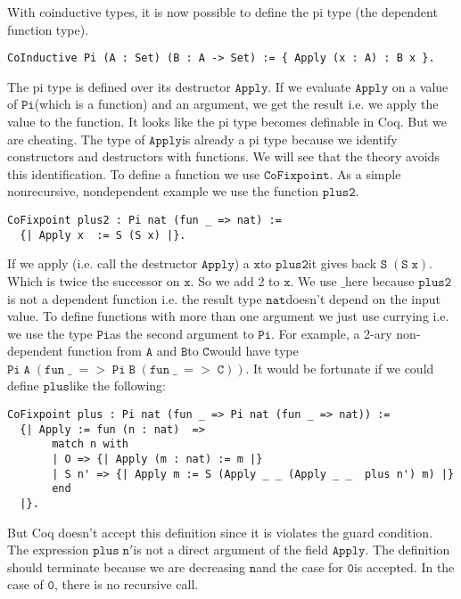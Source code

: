 \documentclass[a4paper,cleardoubleempty,BCOR1cm]{scrbook}
\begin{document}
With coinductive types, it is now possible to define the pi type (the dependent
function type).

\begin{verbatim}
CoInductive Pi (A : Set) (B : A -> Set) := { Apply (x : A) : B x }.
\end{verbatim}

The pi type is defined over its destructor $\mathtt{Apply}$.  If we evaluate $\mathtt{Apply}$
on a value of $\mathtt{Pi}$\;(which is a function) and an argument, we get the result
i.e. we apply the value to the function.  It looks like the pi type becomes definable
in Coq.  But we are cheating.  The type of $\mathtt{Apply}$\;is already a pi type because
we identify constructors and destructors with functions. We will see that
the theory \cite{basold2016type} avoids this identification. To define a
function we use $\mathtt{CoFixpoint}$. As a simple nonrecursive, nondependent example
we use the function $\mathtt{plus2}$.

\begin{verbatim}
CoFixpoint plus2 : Pi nat (fun _ => nat) :=
  {| Apply x  := S (S x) |}.
\end{verbatim}

If we apply (i.e. call the destructor $\mathtt{Apply}$) a $\mathtt{x}$\;to $\mathtt{plus2}$\;it gives back
$\mathtt{S\;(S\;x)}$.  Which is twice the successor on $\mathtt{x}$.  So we add 2 to $\mathtt{x}$.  We
use $\mathtt{\_}$\;here because $\mathtt{plus2}$\;is not a dependent function i.e. the result
type $\mathtt{nat}$\;doesn't depend on the input value.  To define functions with more
than one argument we just use currying i.e. we use the type $\mathtt{Pi}$\;as the
second argument to $\mathtt{Pi}$. For example, a 2-ary non-dependent function from $\mathtt{A}$
and $\mathtt{B}$\;to $\mathtt{C}$\;would have type $\mathtt{Pi\;A\;(fun\;\_\;=>\;Pi\;B\;(fun\;\_\;=>\;C))}$.  It
would be fortunate if we could define $\mathtt{plus}$\;like the following:

\begin{verbatim}
CoFixpoint plus : Pi nat (fun _ => Pi nat (fun _ => nat)) :=
  {| Apply := fun (n : nat)  =>
       match n with
       | O => {| Apply (m : nat) := m |}
       | S n' => {| Apply m := S (Apply _ _ (Apply _ _  plus n') m) |}
       end
  |}.
\end{verbatim}

But Coq doesn't accept this definition since it is violates the guard condition. The
expression $\mathtt{plus\;n'}$\;is not a direct argument of the field $\mathtt{Apply}$. The
definition should terminate because we are decreasing $\mathtt{n}$\;and the case for
$\mathtt{0}$\;is accepted. In the case of $\mathtt{0}$, there is no recursive call.
\end{document}
